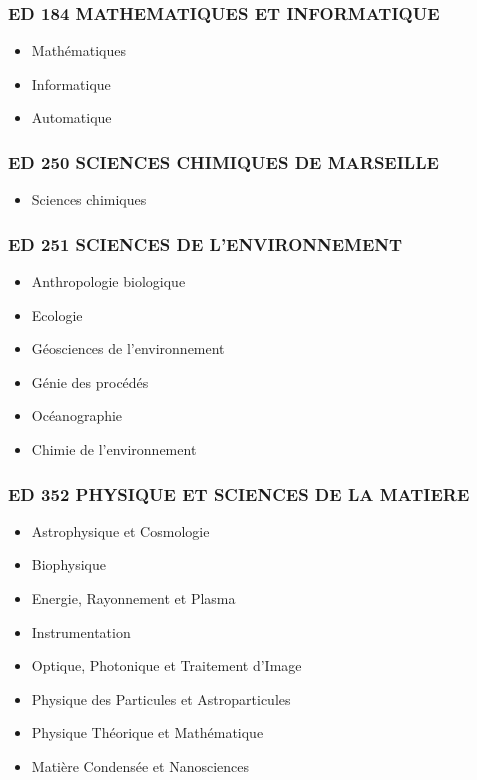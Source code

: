 \subsubsection*{ED 184 MATHEMATIQUES ET INFORMATIQUE}\label{ed-184-mathematiques-et-informatique}

\begin{itemize}
\item Mathématiques
\item Informatique
\item Automatique
\end{itemize}

\subsubsection*{ED 250 SCIENCES CHIMIQUES DE MARSEILLE}\label{ed-250-sciences-chimiques-de-marseille}

\begin{itemize}
\item Sciences chimiques
\end{itemize}

\subsubsection*{ED 251 SCIENCES DE L'ENVIRONNEMENT}\label{ed-251-sciences-de-lenvironnement}

\begin{itemize}
\item Anthropologie biologique
\item Ecologie
\item Géosciences de l'environnement
\item Génie des procédés
\item Océanographie
\item Chimie de l'environnement
\end{itemize}

\subsubsection*{ED 352 PHYSIQUE ET SCIENCES DE LA MATIERE}\label{ed-352-physique-et-sciences-de-la-matiere}

\begin{itemize}
\item Astrophysique et Cosmologie
\item Biophysique
\item Energie, Rayonnement et Plasma
\item Instrumentation
\item Optique, Photonique et Traitement d'Image
\item Physique des Particules et Astroparticules
\item Physique Théorique et Mathématique
\item Matière Condensée et Nanosciences
\end{itemize}

